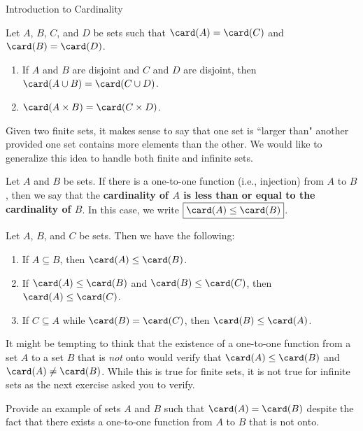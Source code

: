 \begin{section}{Introduction to Cardinality}
\begin{theorem}
Let $A$, $B$, $C$, and $D$ be sets such that $\card(A)=\card(C)$ and $\card(B)=\card(D)$.
\begin{enumerate}[label=\textrm{(\alph*)}]
\item If $A$ and $B$ are disjoint and $C$ and $D$ are disjoint, then $\card(A\cup B)=\card(C\cup D)$.
\item $\card(A\times B)=\card(C\times D)$.
\end{enumerate}
\end{theorem}

Given two finite sets, it makes sense to say that one set is ``larger than" another provided one set contains more elements than the other. We would like to generalize this idea to handle both finite and infinite sets. 

\begin{definition}
Let $A$ and $B$ be sets. If there is a one-to-one function (i.e., injection) from $A$ to $B$, then we say that the \textbf{cardinality of $A$ is less than or equal to the cardinality of $B$}. In this case, we write $\boxed{\card(A)\leq\card(B)}$.
\end{definition}

\begin{theorem}
Let $A$, $B$, and $C$ be sets. Then we have the following:
\begin{enumerate}[label=\textrm{(\alph*)}]
\item If $A\subseteq B$, then $\card(A)\leq \card(B)$.
\item If $\card(A)\leq \card(B)$ and $\card(B)\leq \card(C)$, then $\card(A)\leq \card(C)$.
\item If $C\subseteq A$ while $\card(B)=\card(C)$, then $\card(B)\leq \card(A)$.
\end{enumerate}
\end{theorem}

It might be tempting to think that the existence of a one-to-one function from a set $A$ to a set $B$ that is \emph{not} onto would verify that $\card(A)\leq \card(B)$ and $\card(A)\neq \card(B)$. While this is true for finite sets, it is not true for infinite sets as the next exercise asked you to verify.

\begin{exercise}
Provide an example of sets $A$ and $B$ such that $\card(A)=\card(B)$ despite the fact that there exists a one-to-one function from $A$ to $B$ that is not onto.
\end{exercise}


\end{section}
